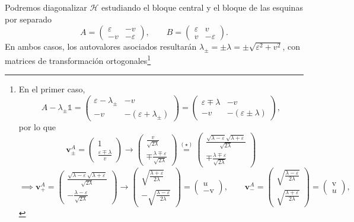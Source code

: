 \documentclass{scrartcl}
\renewcommand{\vb}[1]{\bm{#1}}
\DeclareRobustCommand{\[}{\begin{equation}}
\DeclareRobustCommand{\]}{\end{equation}}
\begin{document}
\begin{enumerate}
\begin{enumerate}
\begin{enumerate}[(i)]
            Podremos diagonalizar $\mathcal{H}$ estudiando el bloque central y el bloque de las esquinas por separado
            \[ A = \begin{pmatrix} \varepsilon & -v \\ -v & -\varepsilon \end{pmatrix}, \quad\quad B = \begin{pmatrix} \varepsilon & v \\ v & -\varepsilon \end{pmatrix}. \]
            En ambos casos, los autovalores asociados resultarán $\lambda_\pm = \pm \lambda = \pm \sqrt{\varepsilon^2 + v^2}$, con matrices de transformación ortogonales\footnote{
                En el primer caso,
                \[ A - \lambda_{\pm} \mathds{1} = \begin{pmatrix} \varepsilon - \lambda_\pm & -v \\ -v & -(\varepsilon + \lambda_\pm) \end{pmatrix} = \begin{pmatrix} \varepsilon \mp \lambda & -v \\ -v & -(\varepsilon \pm \lambda) \end{pmatrix}, \]
                por lo que
                \[ \vb{v}_\pm^A = \begin{pmatrix} 1 \\ \frac{\varepsilon \mp \lambda}{v} \end{pmatrix} \longrightarrow \begin{pmatrix} \frac{v}{\sqrt{2\lambda}} \\ \mp \frac{\lambda \mp \varepsilon}{\sqrt{2\lambda}} \end{pmatrix} \mathrel{\stackrel{(\star)}{=}} \begin{pmatrix} \frac{\sqrt{\lambda - \varepsilon} \sqrt{\lambda + \varepsilon}}{\sqrt{2\lambda}} \\ \mp \frac{\lambda \mp \varepsilon}{\sqrt{2\lambda}} \end{pmatrix} \]
                \[ \implies \vb{v}_+^A = \begin{pmatrix} \frac{\sqrt{\lambda - \varepsilon} \sqrt{\lambda + \varepsilon}}{\sqrt{2\lambda}} \\ - \frac{\lambda - \varepsilon}{\sqrt{2\lambda}} \end{pmatrix} \longrightarrow \begin{pmatrix} \sqrt{\frac{\lambda + \varepsilon}{2\lambda}} \\ -\sqrt{\frac{\lambda - \varepsilon}{2\lambda}} \end{pmatrix} = \begin{pmatrix} u \\ -\mathrm{v} \end{pmatrix}, \quad\quad \vb{v}_-^A = \begin{pmatrix} \sqrt{\frac{\lambda - \varepsilon}{2\lambda}} \\ \sqrt{\frac{\lambda + \varepsilon}{2\lambda}} \end{pmatrix} = \begin{pmatrix} \mathrm{v} \\ u \end{pmatrix}, \]
}
\end{enumerate}
\end{enumerate}
\end{enumerate}
\end{document}
